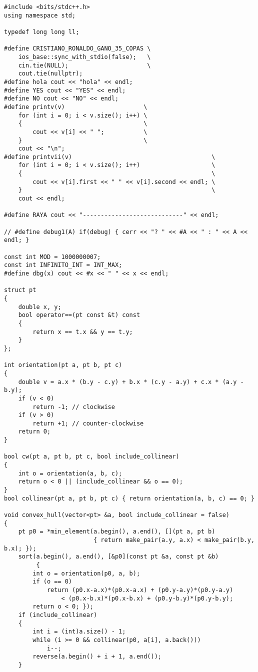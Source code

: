 \begin{lstlisting}
#include <bits/stdc++.h>
using namespace std;

typedef long long ll;

#define CRISTIANO_RONALDO_GANO_35_COPAS \
	ios_base::sync_with_stdio(false);   \
	cin.tie(NULL);                      \
	cout.tie(nullptr);
#define hola cout << "hola" << endl;
#define YES cout << "YES" << endl;
#define NO cout << "NO" << endl;
#define printv(v)                      \
	for (int i = 0; i < v.size(); i++) \
	{                                  \
		cout << v[i] << " ";           \
	}                                  \
	cout << "\n";
#define printvii(v)                                       \
	for (int i = 0; i < v.size(); i++)                    \
	{                                                     \
		cout << v[i].first << " " << v[i].second << endl; \
	}                                                     \
	cout << endl;

#define RAYA cout << "----------------------------" << endl;

// #define debug1(A) if(debug) { cerr << "? " << #A << " : " << A << endl; }

const int MOD = 1000000007;
const int INFINITO_INT = INT_MAX;
#define dbg(x) cout << #x << " " << x << endl;

struct pt
{
	double x, y;
	bool operator==(pt const &t) const
	{
		return x == t.x && y == t.y;
	}
};

int orientation(pt a, pt b, pt c)
{
	double v = a.x * (b.y - c.y) + b.x * (c.y - a.y) + c.x * (a.y - b.y);
	if (v < 0)
		return -1; // clockwise
	if (v > 0)
		return +1; // counter-clockwise
	return 0;
}

bool cw(pt a, pt b, pt c, bool include_collinear)
{
	int o = orientation(a, b, c);
	return o < 0 || (include_collinear && o == 0);
}
bool collinear(pt a, pt b, pt c) { return orientation(a, b, c) == 0; }

void convex_hull(vector<pt> &a, bool include_collinear = false)
{
	pt p0 = *min_element(a.begin(), a.end(), [](pt a, pt b)
						 { return make_pair(a.y, a.x) < make_pair(b.y, b.x); });
	sort(a.begin(), a.end(), [&p0](const pt &a, const pt &b)
		 {
        int o = orientation(p0, a, b);
        if (o == 0)
            return (p0.x-a.x)*(p0.x-a.x) + (p0.y-a.y)*(p0.y-a.y)
                < (p0.x-b.x)*(p0.x-b.x) + (p0.y-b.y)*(p0.y-b.y);
        return o < 0; });
	if (include_collinear)
	{
		int i = (int)a.size() - 1;
		while (i >= 0 && collinear(p0, a[i], a.back()))
			i--;
		reverse(a.begin() + i + 1, a.end());
	}


\end{lstlisting}
